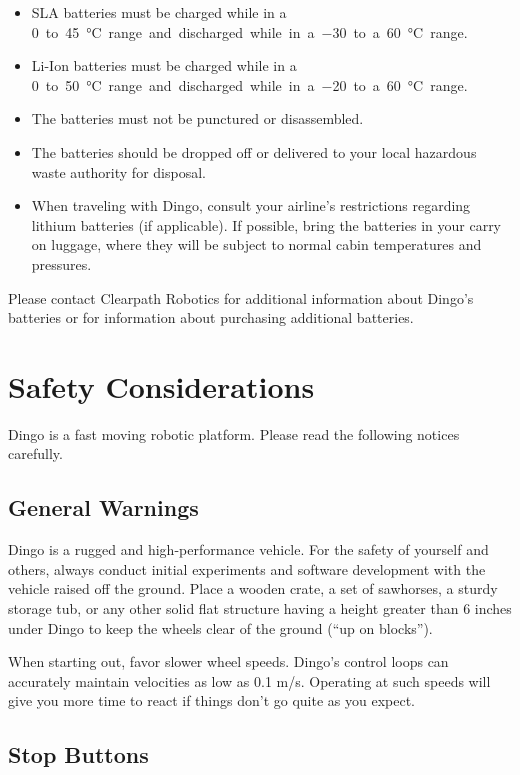 \documentclass[]{clearpath-latex/clearpath-manual}
\begin{document}
\begin{itemize}
\item SLA batteries must be charged while in a \SI{0} to \SI{45}{\celsius} range and discharged while in a \SI{-30} to a \SI{60}{\celsius} range.
\item Li-Ion batteries must be charged while in a \SI{0} to \SI{50}{\celsius} range and discharged while in a \SI{-20} to a \SI{60}{\celsius} range.
\item The batteries must not be punctured or disassembled.
\item The batteries should be dropped off or delivered to your local hazardous waste authority for disposal.
\item When traveling with Dingo, consult your airline's restrictions regarding lithium
	batteries (if applicable). If possible, bring the batteries in your carry on luggage, where they will
be subject to normal cabin temperatures and pressures.
\end{itemize}

Please contact Clearpath Robotics for additional information about Dingo's batteries or
for information about purchasing additional batteries.


\section{Safety Considerations}

Dingo is a fast moving robotic platform. Please read the following notices carefully.

\subsection{General Warnings}

Dingo is a rugged and high-performance vehicle. For the safety of yourself and others, always conduct initial experiments and software development with the vehicle raised off the ground. Place a wooden crate, a set of sawhorses, a sturdy storage tub, or any other solid flat structure having a height greater than 6 inches under Dingo to keep the wheels clear of the ground (“up on blocks”).

When starting out, favor slower wheel speeds. Dingo's control loops can accurately maintain velocities as low as 0.1 m/s. Operating at such speeds will give you more time to react if things don’t go quite as you expect.

\subsection{Stop Buttons}
\end{document}
